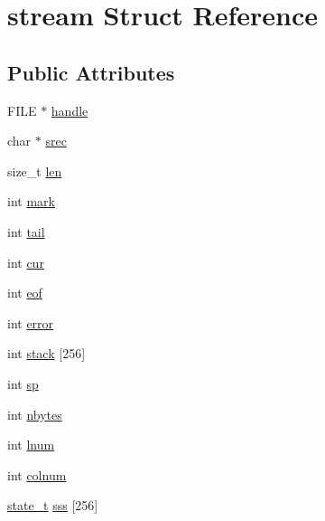 \hypertarget{structstream}{\section{stream Struct Reference}
\label{structstream}
}
\subsection*{Public Attributes}
\begin{DoxyCompactItemize}
\item 
F\-I\-L\-E $\ast$ \hyperlink{structstream_a7a2bb1163cc84edef1678666ff146c9e}{handle}
\item 
char $\ast$ \hyperlink{structstream_a70dd1659d8e72b55e9a04384e42e5a2e}{srec}
\item 
size\-\_\-t \hyperlink{structstream_a7c33eff34c7940579b6beae16ac97274}{len}
\item 
int \hyperlink{structstream_af9f0bf890ddec4e8e0366b6183324b59}{mark}
\item 
int \hyperlink{structstream_a87d56d1718d31df122ffdb24130fc057}{tail}
\item 
int \hyperlink{structstream_a18ac9c9f561a60391e5c98f6154c76b6}{cur}
\item 
int \hyperlink{structstream_a51143a5c7659b6cb3aac7aad3122959b}{eof}
\item 
int \hyperlink{structstream_aab0ed409766d54ed2852649280ec9853}{error}
\item 
int \hyperlink{structstream_a6781fcde4ea4c97987aa528ec2209c97}{stack} \mbox{[}256\mbox{]}
\item 
int \hyperlink{structstream_afb9d3b5861364ce08caba002931bb0c2}{sp}
\item 
int \hyperlink{structstream_aebf93bd9f82ca9ae2488f354f1084e81}{nbytes}
\item 
int \hyperlink{structstream_a91da08fdcb0ddf7d739beb9fdceef290}{lnum}
\item 
int \hyperlink{structstream_a3c721e76d56847595996ac2ccfe6076b}{colnum}
\item 
\hyperlink{eva_8c_a40da074302f35bec741ec7e0d979e1cb}{state\-\_\-t} \hyperlink{structstream_a1d9e8d1872e8c4949671f8e8e805bc2c}{sss} \mbox{[}256\mbox{]}
\end{DoxyCompactItemize}


